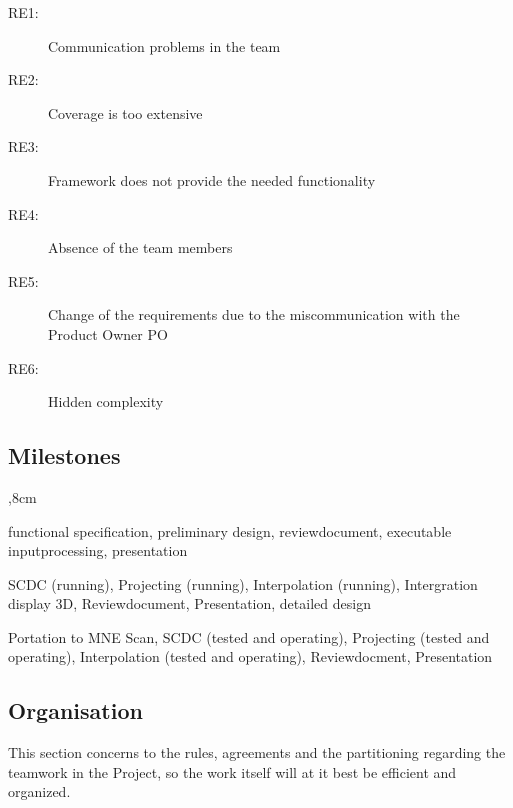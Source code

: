 \begin{description}
	\item[RE1:] Communication problems in the team
	\item[RE2:] Coverage is too extensive
	\item[RE3:] Framework does not provide the needed functionality 
	\item[RE4:] Absence of the team members 
	\item[RE5:] Change of the requirements due to the miscommunication with the Product Owner PO
	\item[RE6:] Hidden complexity 
 \end{description}

\clearpage

\subsection{Milestones}
\begin{description}
	,8cm
	\item[First Milestone:] functional specification, preliminary design, reviewdocument, executable inputprocessing, presentation 
	
	\item[Second Milestone:] SCDC (running), Projecting (running), Interpolation (running), Intergration display 3D, Reviewdocument, Presentation, detailed design
	
	\item[Third Milenstone:] Portation to MNE Scan, SCDC (tested and operating), Projecting (tested and operating), Interpolation (tested and operating), Reviewdocment, Presentation
\end{description}



\subsection{Organisation}

This section concerns to the rules, agreements and the partitioning regarding the teamwork in the Project, so the work itself will at it best be efficient and organized. 

